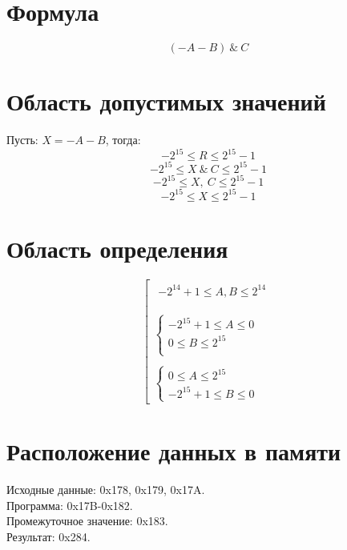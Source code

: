 \documentclass{article}
\begin{document}
\section{Формула}

$$ 
      (-A -B)\ \&\ C 
$$
\section{Область допустимых значений}
Пусть: $ X = -A -B $, тогда:
$$ -2^{15} \le R \le 2^{15} - 1 $$
$$ -2^{15} \le X\ \&\ C \le 2^{15} - 1 $$
$$ -2^{15} \le X,\ C \le 2^{15} - 1 $$
$$ -2^{15} \le X \le 2^{15} - 1 $$




\section{Область определения}
$$
      \left[{ \begin{array}{l}
                        \begin{array}{l} -2^{14}+1 \le A,B \le 2^{14} \\
                        \end{array} \\
                        \\
                        \left\{ \begin{array}{l}
                                      -2^{15}+1 \le A   \le 0 \\
                                      0 \le B   \le 2^{15}    \\
                                \end{array}\right.               \\
                        \\
                        \left\{ \begin{array}{l}
                                      0 \le A   \le 2^{15} \\
                                      -2^{15}+1 \le B   \le 0
                                \end{array}\right.
                  \end{array}}\right.
$$

\section{Расположение данных в памяти}
Исходные данные: 0x178, 0x179, 0x17A. \\
Программа: 0x17B-0x182. \\
Промежуточное значение: 0x183. \\
Результат: 0x284. \\
\end{document}
